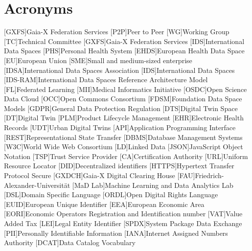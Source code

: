 \chapter{Acronyms}
\begin{acronym}
    [GXFS]{Gaia-X Federation Services}
    [P2P]{Peer to Peer}
    [WG]{Working Group}
    [TC]{Technical Committee}
    [GXFS]{Gaia-X Federation Services}
    [IDS]{International Data Spaces}
    [PHS]{Personal Health System}
    [EHDS]{European Health Data Space}
    [EU]{European Union}
    [SME]{Small and medium-sized enterprise}
    [IDSA]{International Data Spaces Association}
    [IDS]{International Data Spaces}
    [IDS-RAM]{International Data Spaces Reference Architecture Model}
    [FL]{Federated Learning}
    [MII]{Medical Informatics Initiative}
    [OSDC]{Open Science Data Cloud}
    [OCC]{Open Commons Consortium}
    [FDSM]{Foundation Data Space Models}
    [GDPR]{General Data Protection Regulation}
    [DTS]{Digital Twin Space}
    [DT]{Digital Twin}
    [PLM]{Product Lifecycle Management}
    [EHR]{Electronic Health Records}
    [UDT]{Urban Digital Twins}
    [API]{Application Programming Interface}
    [REST]{Representational State Transfer}
    [DBMS]{Database Management Systems}
    [W3C]{World Wide Web Consortium}
    [LD]{Linked Data}
    [JSON]{JavaScript Object Notation}
    [TSP]{Trust Service Provider}
    [CA]{Certification Authority}
    [URL]{Uniform Resource Locator}
    [DID]{Decentralized identifiers}
    [HTTPS]{Hypertext Transfer Protocol Secure}
    [GXDCH]{Gaia-X Digital Clearing House}
    [FAU]{Friedrich-Alexander-Universität}
    [MaD Lab]{Machine Learning and Data Analytics Lab}
    [DSL]{Domain Specific Language}
    [ORDL]{Open Digital Rights Language}
    [EUID]{European Unique Identifier}
    [EEA]{European Economic Area}
    [EORI]{Economic Operators Registration and Identification number}
    [VAT]{Value Added Tax}
    [LEI]{Legal Entity Identifier}
    [SPDX]{System Package Data Exchange}
    [PII]{Personally Identifiable Information}
    [IANA]{Internet Assigned Numbers Authority}
    [DCAT]{Data Catalog Vocabulary}
\end{acronym}%

